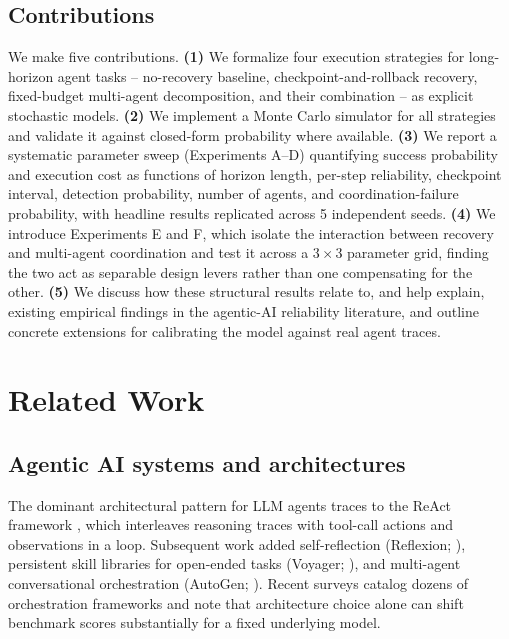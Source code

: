 \documentclass[11pt]{article}
\begin{document}
\subsection{Contributions}
We make five contributions. \textbf{(1)} We formalize four execution strategies for long-horizon agent tasks -- no-recovery baseline, checkpoint-and-rollback recovery, fixed-budget multi-agent decomposition, and their combination -- as explicit stochastic models. \textbf{(2)} We implement a Monte Carlo simulator for all strategies and validate it against closed-form probability where available. \textbf{(3)} We report a systematic parameter sweep (Experiments A--D) quantifying success probability and execution cost as functions of horizon length, per-step reliability, checkpoint interval, detection probability, number of agents, and coordination-failure probability, with headline results replicated across 5 independent seeds. \textbf{(4)} We introduce Experiments E and F, which isolate the interaction between recovery and multi-agent coordination and test it across a $3\times3$ parameter grid, finding the two act as separable design levers rather than one compensating for the other. \textbf{(5)} We discuss how these structural results relate to, and help explain, existing empirical findings in the agentic-AI reliability literature, and outline concrete extensions for calibrating the model against real agent traces.

\section{Related Work}

\subsection{Agentic AI systems and architectures}
The dominant architectural pattern for LLM agents traces to the ReAct framework \citep{yao2022react}, which interleaves reasoning traces with tool-call actions and observations in a loop. Subsequent work added self-reflection (Reflexion; \citealp{shinn2023reflexion}), persistent skill libraries for open-ended tasks (Voyager; \citealp{wang2023voyager}), and multi-agent conversational orchestration (AutoGen; \citealp{wu2023autogen}). Recent surveys catalog dozens of orchestration frameworks and note that architecture choice alone can shift benchmark scores substantially for a fixed underlying model.
\end{document}
